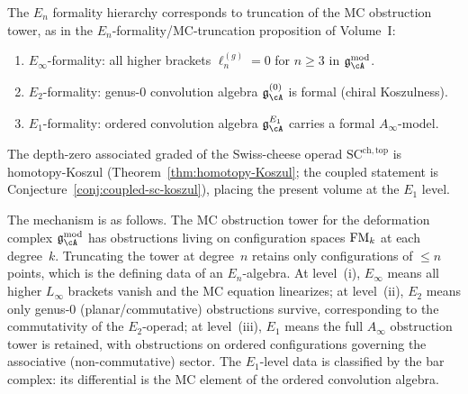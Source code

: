 \begin{construction}
\label{constr:vol2-en-formality}
The $E_n$ formality hierarchy corresponds to truncation of the MC obstruction tower, as in the $E_n$-formality/MC-truncation proposition of Volume~I:
\begin{enumerate}[label=\textup{(\roman*)}]
\item $E_\infty$-formality: all higher brackets $\ell_n^{(g)} = 0$ for $n \geq 3$ in $\gAmod$.
\item $E_2$-formality: genus-$0$ convolution algebra $\mathfrak{g}^{(0)}_\cA$ is formal (chiral Koszulness).
\item $E_1$-formality: ordered convolution algebra $\mathfrak{g}^{E_1}_\cA$ carries a formal $A_\infty$-model.
\end{enumerate}
The depth-zero associated graded of the Swiss-cheese operad $\mathrm{SC}^{\mathrm{ch,top}}$ is homotopy-Koszul (Theorem~\ref{thm:homotopy-Koszul}; the coupled statement is Conjecture~\ref{conj:coupled-sc-koszul}), placing the present volume at the $E_1$ level.

The mechanism is as follows. The MC obstruction tower for the
deformation complex $\gAmod$ has obstructions living on
configuration spaces $\mathrm{FM}_k$ at each degree~$k$. Truncating the tower
at degree~$n$ retains only configurations of $\le n$ points, which is
the defining data of an $E_n$-algebra. At level~(i), $E_\infty$
means all higher $L_\infty$ brackets vanish and the MC equation
linearizes; at level~(ii), $E_2$ means only genus-$0$
(planar/commutative) obstructions survive, corresponding to the
commutativity of the $E_2$-operad; at level~(iii), $E_1$ means the
full $A_\infty$ obstruction tower is retained, with obstructions on
ordered configurations governing the associative (non-commutative)
sector. The $E_1$-level data is classified by the bar complex:
its differential is the MC element of the ordered convolution algebra.
\end{construction}

